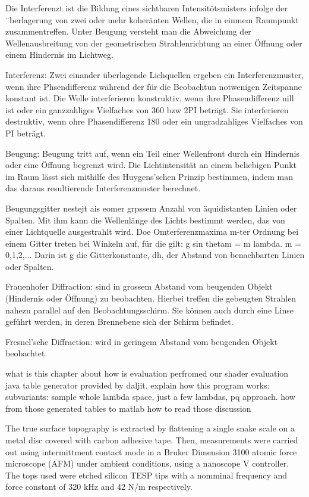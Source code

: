 Die Interferenzt ist die Bildung eines sichtbaren Intensitötsmisters infolge der ¨berlagerung von zwei oder mehr koheränten Wellen, die in einmem Raumpunkt zusammentreffen. Unter Beugung versteht man die Abweichung der Wellenausbreitung von der geometrischen Strahlenrichtung an einer Öffnung oder einem Hindernis im Lichtweg.

Interferenz: Zwei einander überlagende Lichquellen ergeben ein Interferenzmuster, wenn ihre Phsendifferenz während der für die Beobachtun notwenigen Zeitspanne konstant ist. Die Welle interferieren konstruktiv, wenn ihre Phasendifferenz nill ist oder ein ganzzahliges Vielfaches von 360 bzw 2PI beträgt. Sie interferieren destruktiv, wenn ohre Phasendifferenz 180 oder ein ungradzahliges Vielfaches von PI beträgt.

Beugung: Beugung tritt auf, wenn ein Teil einer Wellenfront durch ein Hindernis oder eine Öffnung begrenzt wird. Die Lichtintensität an einem beliebigen Punkt im Raum lässt sich mithilfe des Huygens'schen Prinzip bestimmen, indem man das daraus resultierende Interferenzmuster berechnet.

Beugungsgitter nestejt ais eomer grpssem Anzahl von äquidistanten Linien oder Spalten. Mit ihm kann die Wellenlänge des Lichts bestimmt werden, das von einer Lichtquelle ausgestrahlt wird. Doe Omterferenzmaxima m-ter Ordnung bei einem Gitter treten bei Winkeln auf, für die gilt: g sin thetam = m lambda. m = 0,1,2,...
Darin ist g die Gitterkonstante, dh, der Abstand von benachbarten Linien oder Spalten.

Frauenhofer Diffraction: sind in grossem Abstand vom beugenden Objekt (Hindernis oder Öffnung) zu beobachten. Hierbei treffen die gebeugten Strahlen nahezu parallel auf den Beobachtungsschirm. Sie können auch durch eine Linse geführt werden, in deren Brennebene sich der Schirm befindet.

Fresnel'sche Diffraction: wird in geringem Abstand vom beugenden Objekt beobachtet.





what is this chapter about
how is evaluation perfromed
our shader
evaluation java table generator provided by daljit.
explain how this program works:
subvariants: sample whole lambda space, just a few lambdas, pq approach.
how from those generated tables to matlab
how to read those
discussion

The true surface topography is extracted by flattening a single snake scale on a metal disc covered with carbon adhesive tape. Then, measurements were carried out using intermittment contact mode in a Bruker Dimension 3100 atomic force microscope (AFM) under ambient conditions, using a nanoscope V controller. The tops used were etched silicon TESP tips with a nomminal frequency and force constant of 320 kHz and 42 N/m respectively. 

